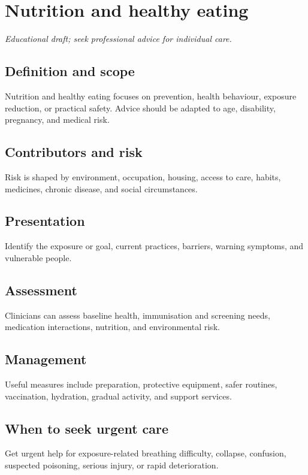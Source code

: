 \chapter{Nutrition and healthy eating}

\medskip
\noindent\textit{Educational draft; seek professional advice for individual care.}

\section*{Definition and scope}
Nutrition and healthy eating focuses on prevention, health behaviour, exposure reduction, or practical safety. Advice should be adapted to age, disability, pregnancy, and medical risk.

\section*{Contributors and risk}
Risk is shaped by environment, occupation, housing, access to care, habits, medicines, chronic disease, and social circumstances.

\section*{Presentation}
Identify the exposure or goal, current practices, barriers, warning symptoms, and vulnerable people.

\section*{Assessment}
Clinicians can assess baseline health, immunisation and screening needs, medication interactions, nutrition, and environmental risk.

\section*{Management}
Useful measures include preparation, protective equipment, safer routines, vaccination, hydration, gradual activity, and support services.

\section*{When to seek urgent care}
Get urgent help for exposure-related breathing difficulty, collapse, confusion, suspected poisoning, serious injury, or rapid deterioration.

